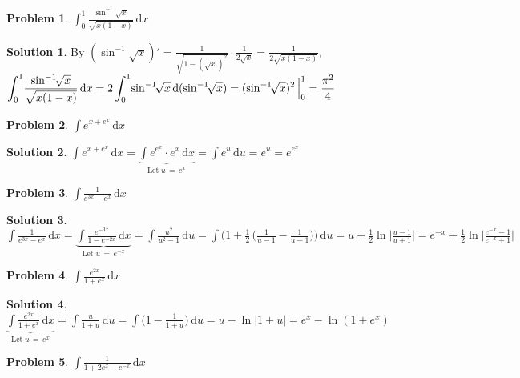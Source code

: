 \documentclass[11pt,a4paper]{article}
\newcommand{\ds}{\displaystyle}
\theoremstyle{definition}
\newtheorem*{problem}{Problem}
\newtheorem*{solution}{Solution}
\begin{document}
\begin{problem}
  $\ds\int_0^1\!\frac{\sin^{-1}\!\!\sqrt{x}}{\sqrt{x(1-x)}}\,\text{d}x$
\end{problem}

\begin{solution}
  By $\ds(\sin^{-1}\!\!\sqrt{x})' = \frac{1}{\sqrt{1 - (\sqrt{x})^2}}\cdot\frac{1}{2\sqrt{x}} = \frac{1}{2\sqrt{x(1 - x)}}$, $\ds\int_0^1\!\frac{\sin^{-1}\!\!\sqrt{x}}{\sqrt{x(1-x)}}\,\text{d}x = 2\int_0^1\!\sin^{-1}\!\!\sqrt{x}\,\text{d}(\sin^{-1}\!\!\sqrt{x}) \\= (\sin^{-1}\!\!\sqrt{x})^2\,\Big|_0^1 = \frac{\pi^2}{4}$
\end{solution}

\begin{problem}
  $\ds\int\!e^{x+e^x}\,\text{d}x$
\end{problem}

\begin{solution}
  $\ds\int\!e^{x+e^x}\,\text{d}x = \underbrace{\int\!e^{e^x}\cdot e^x\,\text{d}x}_{\text{Let}\;u\,=\,e^x} = \int\!e^u\,\text{d}u = e^u = e^{e^x}$
\end{solution}

\begin{problem}
  $\ds\int\!\frac{1}{e^{3x}-e^x}\,\text{d}x$
\end{problem}

\begin{solution}
  $\ds\int\!\frac{1}{e^{3x}-e^x}\,\text{d}x = \underbrace{\int\!\frac{e^{-3x}}{1 - e^{-2x}}\,\text{d}x}_{\text{Let}\;u\,=\,e^{-x}} = \int\!\frac{u^2}{u^2 - 1}\,\text{d}u = \int\!\Big(1 + \frac{1}{2}\,\Big(\frac{1}{u - 1} - \frac{1}{u + 1}\Big)\Big)\,\text{d}u = u + \frac{1}{2}\ln\Big|\frac{u - 1}{u + 1}\Big| = e^{-x} + \frac{1}{2}\ln\Big|\frac{e^{-x} - 1}{e^{-x} + 1}\Big|$
\end{solution}

\begin{problem}
  $\ds\int\!\frac{e^{2x}}{1+e^x}\,\text{d}x$
\end{problem}

\begin{solution}
  $\ds\underbrace{\int\!\frac{e^{2x}}{1+e^x}\,\text{d}x}_{\text{Let}\;u\,=\,e^x} = \int\!\frac{u}{1 + u}\,\text{d}u = \int\!\Big(1 - \frac{1}{1 + u}\Big)\,\text{d}u = u - \ln|1 + u| = e^x - \ln(1 + e^x)$
\end{solution}

\begin{problem}
  $\ds\int\!\frac{1}{1+2e^x-e^{-x}}\,\text{d}x$
\end{problem}
\end{document}
